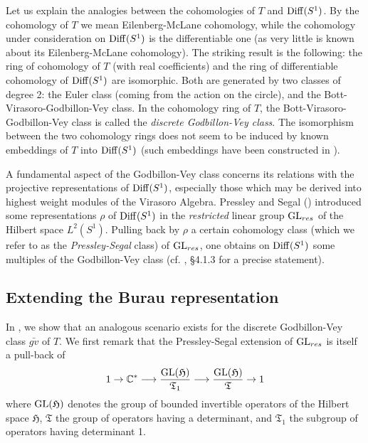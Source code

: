 \documentclass[twoside]{irmaems}
\theoremstyle{plain}
\theoremstyle{definition}
\theoremstyle{remark}
\newcommand{\C}{{\mathbb{C}}}
\begin{document}
\vspace{0.1cm}\noindent
 Let us explain the analogies 
 between the cohomologies of $T$ and ${\rm Diff}(S^1)$. By the cohomology of $T$ we mean Eilenberg-McLane cohomology, while the cohomology under consideration on ${\rm Diff}(S^1)$ is the differentiable one (as very little is known about its Eilenberg-McLane cohomology).
The striking result is the following: 
the ring of cohomology of $T$ (with real coefficients) and the ring of differentiable cohomology of ${\rm Diff}(S^1)$ are isomorphic. Both are generated 
by two classes of degree 2: the Euler class (coming from the action on the circle), and 
the Bott-Virasoro-Godbillon-Vey class. 
In the cohomology ring of $T$, the Bott-Virasoro-Godbillon-Vey class is called the {\it discrete Godbillon-Vey class}.  
The isomorphism between the two cohomology rings does not seem to be induced by 
known embeddings of $T$ into ${\rm Diff}(S^1)$ (such embeddings have been constructed in \cite{gh-se}).

\vspace{0.1cm}\noindent 
A fundamental aspect of the Godbillon-Vey class concerns its relations with 
the projective representations  of ${\rm Diff}(S^1)$, especially those 
which may be derived into highest weight 
modules of the Virasoro Algebra. Pressley and Segal (\cite{pr-se}) introduced some representations $\rho$ of
 ${\rm Diff}(S^1)$ in the {\it restricted} linear group ${\rm GL}_{res}$ of the Hilbert space $L^2(S^1)$. 
 Pulling back by $\rho$ a certain cohomology class  (which we refer to as 
the {\it Pressley-Segal} class) of 
 ${\rm GL}_{res}$, one obtains on  ${\rm Diff}(S^1)$ some multiples of the Godbillon-Vey class (cf. \cite{ka-se}, \S 4.1.3 
 for a precise statement). 

\subsection{Extending the Burau representation}

In  \cite{ka-se}, we show that an analogous scenario exists for the discrete Godbillon-Vey class $\bar{gv}$ of $T$. 
We first remark that the Pressley-Segal extension of ${\rm GL}_{res}$ is itself a pull-back of 
$$1\rightarrow \C^*\longrightarrow \frac{{\rm GL}(\mathfrak{H})}{\mathfrak{T}_1}\longrightarrow \frac{{\rm GL}(\mathfrak{H})}{\mathfrak{T}}\rightarrow 1$$
where ${\rm GL}(\mathfrak{H})$ denotes the group of bounded invertible operators of the Hilbert space 
$\mathfrak{H}$, $\mathfrak{T}$ the group of operators having a determinant,
and  $\mathfrak{T}_1$ the subgroup of operators having determinant 1.
\end{document}

